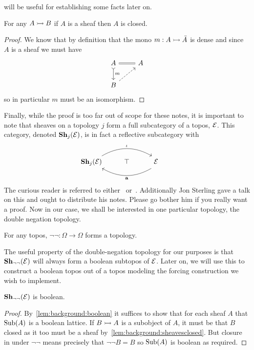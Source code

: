 will be useful for establishing some facts later on.
\begin{lem}\label{lem:background:sheavesclosed}
  For any $A \mono B$ if $A$ is a sheaf then $A$ is closed.
\end{lem}
\begin{proof}
  We know that by definition that the mono $m : A \mono \bar{A}$ is
  dense and since $A$ is a sheaf we must have
  \[
    \begin{tikzcd}
      A \ar[d, rightarrowtail, "m"] \ar[r, equals] & A\\
      B \ar[ur, dashed]
    \end{tikzcd}
  \]
  so in particular $m$ must be an isomorphism.
\end{proof}

Finally, while the proof is too far out of scope for these notes, it
is important to note that sheaves on a topology $j$ form a full
subcategory of a topos, $\Etop$. This category, denoted
$\sheaves[j]{\Etop}$, is in fact a reflective subcategory with
\[
  \begin{tikzcd}
    \sheaves[j]{\Etop} \ar[rr, bend left, "\iota"] & \top &
    \makebox[0pt]{\phantom{\textbf{Sh}}$\Etop$}\phantom{\sheaves[j]{\Etop}}
    \ar[ll, bend left, "\sheafify"]
  \end{tikzcd}
\]
The curious reader is referred to either~\citet{MacLane:92}
or~\citet{Johnstone:14}. Additionally Jon Sterling gave a talk on this
and ought to distribute his notes. Please go bother him if you really
want a proof. Now in our case, we shall be interested in one
particular topology, the double negation topology.
\begin{example}\label{ex:background:doublenegation}
  For any topos, $\neg\neg : \Omega \to \Omega$ forms a topology.
\end{example}
The useful property of the double-negation topology for our purposes
is that $\sheaves[\neg\neg]{\Etop}$ will always form a boolean
subtopos of $\Etop$. Later on, we will use this to construct a boolean
topos out of a topos modeling the forcing construction we wish to
implement.

\begin{lem}\label{lem:background:notnotboolean}
  $\sheaves[\neg\neg]{\Etop}$ is boolean.
\end{lem}
\begin{proof}
  By~\ref{lem:background:boolean} it suffices to show that for each
  sheaf $A$ that $\sub(A)$ is a boolean lattice. If $B \mono A$ is a
  subobject of $A$, it must be that $B$ closed as it too must be a
  sheaf by~\ref{lem:background:sheavesclosed}. But closure in under
  $\neg\neg$ means precisely that $\neg \neg B = B$ so $\sub(A)$ is
  boolean as required.
\end{proof}

